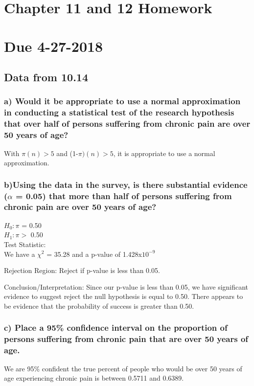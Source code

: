 \documentclass{article}
\begin{document}
\section*{Chapter 11 and 12 Homework}
\section*{Due 4-27-2018}
\subsection*{Data from 10.14}
\subsubsection*{a) Would it be appropriate to use a normal approximation in conducting a
statistical test of the research hypothesis that over half of persons suffering
from chronic pain are over 50 years of age?}
With $\pi(n) > 5$ and (1-$\pi)(n) > 5$, it is appropriate to use a normal approximation.  \\

\subsubsection*{b)Using the data in the survey, is there substantial evidence ($\alpha$ = 0.05) 
that more than half of persons suffering from chronic pain are over 50 years of age?}

$H_{0}: \pi$ = 0.50 \\
$H_{1}: \pi >$ 0.50 \\

Test Statistic: \\
We have a $\chi^{2}$ = 35.28 and a p-value of 1.428x$10^{-9}$

Rejection Region:
Reject if p-value is less than 0.05.  

Conclusion/Interpretation:
Since our p-value is less than 0.05, we have significant evidence to suggest reject the null hypothesis is equal to 0.50.  There appears to be evidence that the probability of success is greater than 0.50.  

\subsubsection*{c) Place a 95\% confidence interval on the proportion of persons suffering from 
chronic pain that are over 50 years of age.}
We are 95\% confident the true percent of people who would be over 50 years of age experiencing chronic pain is between 0.5711 and 0.6389.  
\end{document}
